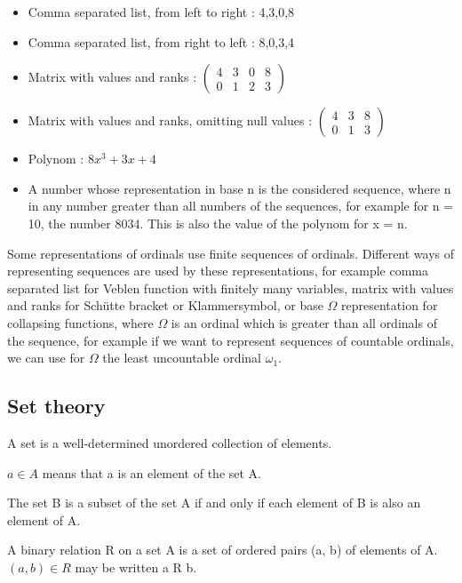 \documentclass[10pt]{article}
\begin{document}
\begin{itemize}
     \setlength{\itemsep}{1pt}
     \setlength{\parskip}{0pt}
     \setlength{\parsep}{0pt}
\item Comma separated list, from left to right : 4,3,0,8
\item Comma separated list, from right to left : 8,0,3,4
\item Matrix with values and ranks :
\(
  \begin{pmatrix}
    4 & 3 & 0 & 8 \\
    0 & 1 & 2 & 3
  \end{pmatrix}
\)
\item Matrix with values and ranks, omitting null values :
\(
  \begin{pmatrix}
    4 & 3 & 8 \\
    0 & 1 & 3
  \end{pmatrix}
\)
\item Polynom : \( 8 x^3 + 3 x + 4 \)
\item A number whose representation in base n is the considered sequence, where n in any number greater than all numbers of the sequences, for example for n = 10, the number 8034. This is also the value of the polynom for x = n.
\end{itemize}

Some representations of ordinals use finite sequences of ordinals. Different ways of representing sequences are used by these representations, for example comma separated list for Veblen function with finitely many variables, matrix with values and ranks for Schütte bracket or Klammersymbol, or base \( \Omega \) representation for collapsing functions, where \( \Omega \) is an ordinal which is greater than all ordinals of the sequence, for example if we want to represent sequences of countable ordinals, we can use for \( \Omega \) the least uncountable ordinal \( \omega_1 \).

\subsection{Set theory}

A set is a well-determined unordered collection of elements. 

\( a \in A \) means that a is an element of the set A.

The set B is a subset of the set A if and only if each element of B is also an element of A. 

A binary relation R on a set A is a set of ordered pairs (a, b) of elements of A. \( (a, b) \in R \) may be written a R b.
\end{document}
